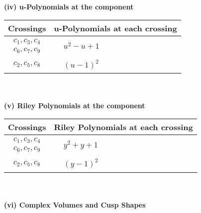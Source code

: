 \documentclass[1p]{elsarticle_modified}
\theoremstyle{definition}
\begin{document}
\newpage\renewcommand{\arraystretch}{1}
\flushleft \textbf{(iv) u-Polynomials at the component}\newline \\
\begin{tabular}{m{50pt}|m{274pt}}
Crossings & \hspace{64pt}u-Polynomials at each crossing \\
\hline $$\begin{aligned}c_{1},c_{3},c_{4}\\c_{6},c_{7},c_{9}\end{aligned}$$&$\begin{aligned}
&u^2- u+1
\end{aligned}$\\
\hline $$\begin{aligned}c_{2},c_{5},c_{8}\end{aligned}$$&$\begin{aligned}
&(u-1)^2
\end{aligned}$\\
\hline
\end{tabular}\\~\\
\newpage\renewcommand{\arraystretch}{1}
\flushleft \textbf{(v) Riley Polynomials at the component}\newline \\
\begin{tabular}{m{50pt}|m{274pt}}
Crossings & \hspace{64pt}Riley Polynomials at each crossing \\
\hline $$\begin{aligned}c_{1},c_{3},c_{4}\\c_{6},c_{7},c_{9}\end{aligned}$$&$\begin{aligned}
&y^2+y+1
\end{aligned}$\\
\hline $$\begin{aligned}c_{2},c_{5},c_{8}\end{aligned}$$&$\begin{aligned}
&(y-1)^2
\end{aligned}$\\
\hline
\end{tabular}\\~\\
\newpage\flushleft \textbf{(vi) Complex Volumes and Cusp Shapes}
\end{document}
